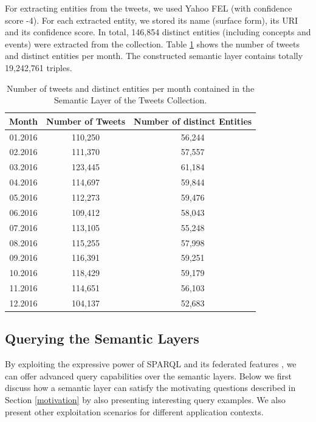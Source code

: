\documentclass[twocolumn]{svjour3}
\begin{document}
For extracting entities from the tweets,
we used Yahoo FEL (with confidence score -4).
For each extracted entity, we stored its name (surface form),
its URI and its confidence score.
In total, 146,854 distinct entities (including concepts and events)
were extracted from the collection.
Table \ref{tbl:twitter-fel} shows the number of tweets and distinct
entities per month.
The constructed semantic layer contains totally 19,242,761 triples.

\begin{table}[]
\centering
\caption{Number of tweets and distinct entities per month contained in the Semantic Layer of the Tweets Collection.}
\label{tbl:twitter-fel}
\vspace{-2mm}
\setlength{\tabcolsep}{3pt}
\begin{tabular}{|c|c|c|}
\hline
\rowcolor[HTML]{EFEFEF}
{\color[HTML]{000000} Month} & {\color[HTML]{000000} Number of Tweets} & {\color[HTML]{000000} Number of distinct Entities} \\ \hline
01.2016 & 110,250 & 56,244 \\ \hline
02.2016 & 111,370 & 57,557 \\ \hline
03.2016 & 123,445 & 61,184 \\ \hline
04.2016 & 114,697 & 59,844 \\ \hline
05.2016 & 112,273 & 59,476 \\ \hline
06.2016 & 109,412 & 58,043 \\ \hline
07.2016 & 113,105 & 55,248 \\ \hline
08.2016 & 115,255 & 57,998 \\ \hline
09.2016 & 116,391 & 59,251 \\ \hline
10.2016 & 118,429 & 59,179 \\ \hline
11.2016 & 114,651 & 56,103\\ \hline
12.2016 & 104,137 & 52,683\\ \hline
\end{tabular}
\end{table}


\subsection{Querying the Semantic Layers}
\label{queryCapabilities} By exploiting the expressive power of
SPARQL \cite{prud2008sparql} and its federated features
\cite{prud2013sparql,fafalios2016querying}, we can offer advanced
query capabilities over the semantic layers. Below we first discuss
how a semantic layer can satisfy the motivating questions described
in Section \ref{motivation} by also presenting interesting query
examples. We also present other exploitation scenarios for different
application contexts.
\end{document}
